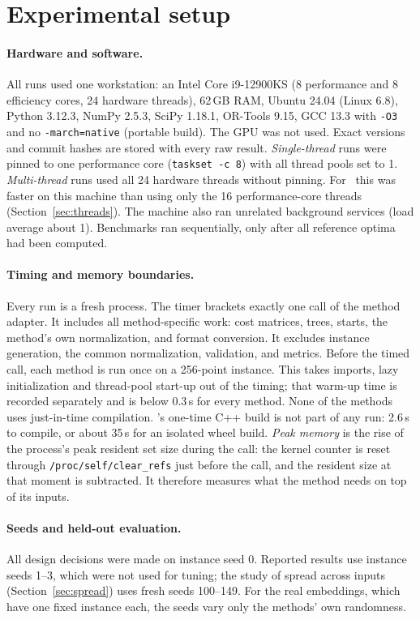 \section{Experimental setup}
\label{sec:setup}

\paragraph{Hardware and software.} All runs used one workstation: an Intel Core
i9-12900KS (8 performance and 8 efficiency cores, 24 hardware threads), 62\,GB RAM,
Ubuntu 24.04 (Linux 6.8), Python 3.12.3, NumPy 2.5.3, SciPy 1.18.1, OR-Tools 9.15,
GCC 13.3 with \texttt{-O3} and no \texttt{-march=native} (portable build). The GPU was
not used. Exact versions and commit hashes are stored with every raw result.
\emph{Single-thread} runs were pinned to one performance core (\texttt{taskset -c 8}) with
all thread pools set to 1. \emph{Multi-thread} runs used all 24 hardware threads without
pinning. For \ShuffleSnap\ this was faster on this machine than using only the 16
performance-core threads (Section~\ref{sec:threads}). The machine also ran unrelated background services
(load average about 1). Benchmarks ran sequentially, only after all reference optima had
been computed.

\paragraph{Timing and memory boundaries.} Every run is a fresh process. The timer
brackets exactly one call of the method adapter. It includes all method-specific work:
cost matrices, trees, starts, the method's own normalization, and format conversion. It
excludes instance generation, the common normalization, validation, and metrics. Before
the timed call, each method is run once on a 256-point instance. This takes imports,
lazy initialization and thread-pool start-up out of the timing; that warm-up time is
recorded separately and is below 0.3\,s for every method. None of the methods uses
just-in-time compilation. \ShuffleSnap's one-time C++ build is not part of any run: 2.6\,s to compile, or about 35\,s
for an isolated wheel build. \emph{Peak memory} is the rise of the process's peak resident set size during
the call: the kernel counter is reset through \texttt{/proc/self/clear\_refs} just before
the call, and the resident size at that moment is subtracted. It therefore measures
what the method needs on top of its inputs.

\paragraph{Seeds and held-out evaluation.} All design decisions were made on instance
seed 0. Reported results use instance seeds 1--3, which were not used for tuning; the study
of spread across inputs (Section~\ref{sec:spread}) uses fresh seeds 100--149. For
the real embeddings, which have one fixed instance each, the seeds vary only the
methods' own randomness.

